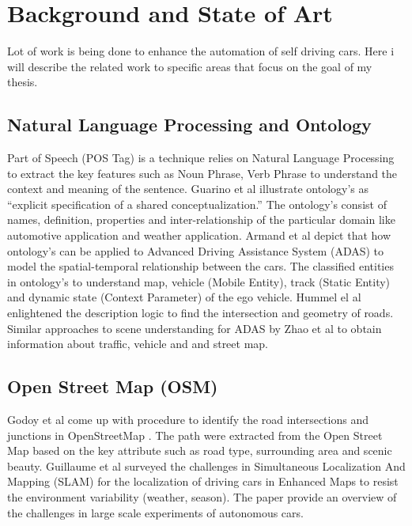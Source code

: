 \section{Background and State of Art}
Lot of work is being done to enhance the automation of self driving cars. Here i will describe the related work to specific areas that focus on the goal of my thesis.  

\subsection{Natural Language Processing and Ontology}

Part of Speech (POS Tag)\cite{marquez1998part} is a technique relies on Natural Language Processing \cite{loper2002nltk} to extract the key features \cite{mitkov2007anaphora} such as Noun Phrase, Verb Phrase to understand the context and meaning of the sentence. Guarino et al \cite{guarino2009ontology} illustrate ontology's as “explicit specification of a shared conceptualization.” The ontology's \cite{studer1998knowledge} consist of names, definition, properties and inter-relationship of the particular domain like automotive application and weather application. Armand et al \cite{armand2014ontology} depict that how ontology's can be applied to Advanced Driving Assistance System (ADAS) to model the spatial-temporal relationship between the cars. The classified entities in ontology’s to understand map, vehicle (Mobile Entity), track (Static Entity) and dynamic state (Context Parameter) of the ego vehicle. Hummel el al\cite{hummel2008scene} enlightened the description logic to find the intersection and geometry of roads. Similar approaches to scene understanding for ADAS by Zhao et al \cite{zhao2015ontology} to obtain information about traffic, vehicle and and street map.

\subsection{Open Street Map (OSM)}
Godoy et al\cite{godoy2019self} come up with procedure to identify the road intersections and junctions in OpenStreetMap \cite{haklay2008openstreetmap}. The path were extracted from the Open Street Map based on the key attribute such as road type, surrounding area and scenic beauty. Guillaume et al \cite{bresson2017simultaneous} surveyed the challenges in Simultaneous Localization And Mapping (SLAM) for the localization of driving cars in Enhanced Maps to resist the environment variability (weather, season). The paper provide an overview of the challenges in large scale experiments of autonomous cars.  

